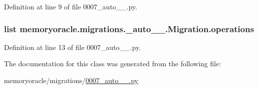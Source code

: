 Definition at line 9 of file 0007\+\_\+auto\+\_\+\_.\+py.

\hypertarget{classmemoryoracle_1_1migrations_1_10007__auto__20150403__0248_1_1Migration_aceea320cde2ae6cf73a1260b67c51c1e}{}
\subsubsection[{operations}]{\setlength{\rightskip}{0pt plus 5cm}list memoryoracle.\+migrations.\+\_\+auto\+\_\+\_.\+Migration.\+operations\hspace{0.3cm}{\ttfamily [static]}}\label{classmemoryoracle_1_1migrations_1_10007__auto__20150403__0248_1_1Migration_aceea320cde2ae6cf73a1260b67c51c1e}


Definition at line 13 of file 0007\+\_\+auto\+\_\+\_.\+py.



The documentation for this class was generated from the following file\+:\begin{DoxyCompactItemize}
\item 
memoryoracle/migrations/\hyperlink{0007__auto__20150403__0248_8py}{0007\+\_\+auto\+\_\+\_.\+py}\end{DoxyCompactItemize}
